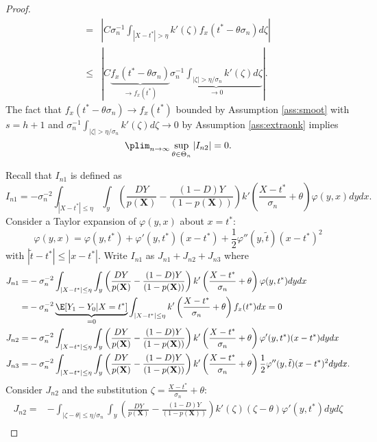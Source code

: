 {\begin{proof}
\begin{align}
            =& \left|C \sigma_n^{-1} \int_{|X-t^*|>\eta} k'\left(\zeta \right) f_x(t^* - \theta\sigma_n) d\zeta \right| \\
            \leq & \left| C \underbrace{f_x(t^* - \theta\sigma_n)}_{\rightarrow f_x(t^*)} \underbrace{\sigma_n^{-1}  \int_{|\zeta|>\eta/\sigma_n} k'\left(\zeta \right) d\zeta}_{\rightarrow 0} \right|.
        \end{align}
        The fact that $f_x(t^* - \theta\sigma_n)\rightarrow f_x(t^*)$ bounded by Assumption \ref{ass:smoot} with $s=h+1$ and $\sigma_n^{-1}  \int_{|\zeta|>\eta/\sigma_n} k'\left(\zeta \right) d\zeta \rightarrow 0$ by Assumption \ref{ass:extraonk} implies $$\plim_{n \rightarrow \infty}  \sup_{\theta\in \Theta_n} |I_{n2}| = 0.$$

        Recall that $I_{n1}$ is defined as $$I_{n1} = - \sigma_n^{-2} \int_{|X-t^*| \leq \eta} \int_y \left(\frac{D Y}{p(\textbf{X})} - \frac{(1-D) Y}{(1-p(\textbf{X}))} \right) k'\left(\frac{X - t^*}{\sigma_n} + \theta \right) \varphi(y,x) dy dx.$$ Consider a Taylor expansion of $\varphi(y,x)$ about $x=t^*$: $$ \varphi(y,x) = \varphi(y,t^*) + \varphi'(y,t^*)(x - t^*) + \frac{1}{2} \varphi''(y,\tilde{t})(x - t^*)^2$$ with $|\tilde{t}-t^*| \leq |x - t^*|$. Write $I_{n1}$ as $J_{n1}+J_{n2}+J_{n3}$ where
        \begin{align}
            J_{n1} =& -\sigma_n^{-2} \int_{|X-t^*| \leq \eta} \int_y \left(\frac{D Y}{p(\textbf{X})} - \frac{(1-D) Y}{(1-p(\textbf{X}))} \right) k'\left(\frac{X - t^*}{\sigma_n} + \theta \right) \varphi(y,t^*) dy dx \\
            =& -\sigma_n^{-2} \underbrace{\E[Y_1 -Y_0|X=t^*]}_{=0} \int_{|X-t^*| \leq \eta} k'\left(\frac{X - t^*}{\sigma_n} + \theta \right) f_x(t^*) dx = 0 \\
            J_{n2} =& -\sigma_n^{-2} \int_{|X-t^*| \leq \eta} \int_y \left(\frac{D Y}{p(\textbf{X})} - \frac{(1-D) Y}{(1-p(\textbf{X}))} \right) k'\left(\frac{X - t^*}{\sigma_n} + \theta \right) \varphi'(y,t^*)(x - t^*) dy dx \\
            J_{n3} =& -\sigma_n^{-2} \int_{|X-t^*| \leq \eta} \int_y \left(\frac{D Y}{p(\textbf{X})} - \frac{(1-D) Y}{(1-p(\textbf{X}))} \right) k'\left(\frac{X - t^*}{\sigma_n} + \theta \right) \frac{1}{2} \varphi''(y,\tilde{t})(x - t^*)^2 dy dx.
        \end{align}
        Consider $J_{n2}$ and the substitution $\zeta = \frac{X - t^*}{\sigma_n} + \theta$:
        \begin{align}
            J_{n2} =& -\int_{|\zeta - \theta| \leq \eta/\sigma_n} \int_y \left(\frac{D Y}{p(\textbf{X})} - \frac{(1-D) Y}{(1-p(\textbf{X}))} \right) k'\left(\zeta \right) (\zeta - \theta) \varphi'(y,t^*) dy d\zeta \\

\end{align}
\end{proof}}
